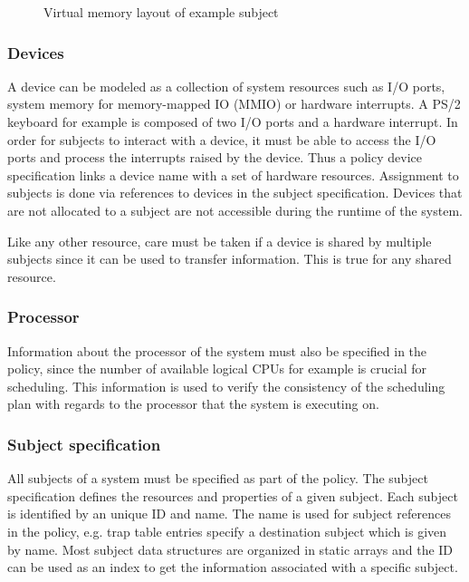\begin{figure}[h]
	\centering
	
	\caption{Virtual memory layout of example subject}
	\label{fig:virt-mem-layout-example}
\end{figure}

\subsubsection{Devices}
A device can be modeled as a collection of system resources such as I/O ports,
system memory for memory-mapped IO (MMIO) or hardware interrupts. A PS/2
keyboard for example is composed of two I/O ports and a hardware interrupt.  In
order for subjects to interact with a device, it must be able to access the I/O
ports and process the interrupts raised by the device. Thus a policy device
specification links a device name with a set of hardware resources. Assignment
to subjects is done via references to devices in the subject specification.
Devices that are not allocated to a subject are not accessible during the
runtime of the system.

Like any other resource, care must be taken if a device is shared by multiple
subjects since it can be used to transfer information. This is true for any
shared resource.

\subsubsection{Processor}
Information about the processor of the system must also be specified in the
policy, since the number of available logical CPUs for example is crucial for
scheduling. This information is used to verify the consistency of the scheduling
plan with regards to the processor that the system is executing on.

\subsubsection{Subject specification}
All subjects of a system must be specified as part of the policy. The subject
specification defines the resources and properties of a given subject. Each
subject is identified by an unique ID and name. The name is used for subject
references in the policy, e.g. trap table entries specify a destination subject
which is given by name. Most subject data structures are organized in static
arrays and the ID can be used as an index to get the information associated
with a specific subject.

